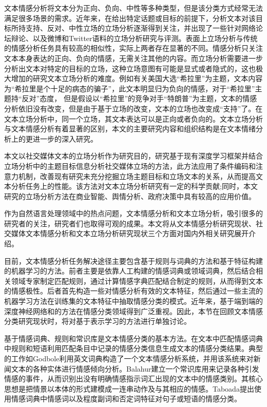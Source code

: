 文本情感分析将文本分为正向、负向、中性等多种类型，但是该分类方式经常无法满足很多场景的需求。近年来，在给出特定话题或目标的前提下，分析文本对该目标所持支持、反对、中性立场的立场分析逐渐得到关注，并出现了一些针对网络论坛辩论、以及微博和Twitter语料的立场分析研究与评测。表面上立场分析与传统的情感分析任务具有较高的相似性，实际上两者存在显著的不同。情感分析只关注文本本身表达的正向、负向的情感，无需关注其他的内容。而立场分析需要进一步分析出文本对特定的目标的立场，这种立场意图有可能是显式或者隐式的，这也极大增加的研究文本立场分析的难度。例如有关美国大选“希拉里”为主题，文本内容为“希拉里是个十足的病态的骗子”，此文本明显归为负向的情感，对于“希拉里”主题持“反对”态度， 但是假设以“希拉里”的竞争对手“特朗普”为主题，文本的情感分析依旧没有改变，但是由于基于立场的改变，文本的立场也改变成“支持”了。在文本立场分析中，同一个立场，其文本表达可以是正向或者负向的。文本立场分析与文本情感分析有着显著的区别，本文的主要研究内容和组织结构是在文本情绪分析上的更进一步的深入研究。

本文以社交媒体文本的立场分析作为研究目的，研究基于现有深度学习框架并结合立场分析中的主题目标信息分析社交媒体立场的方法，此方法应用了条件编码和注意力机制，改善现有研究未充分挖掘立场主题目标和立场文本的关系，从而提高文本分析任务上的性能。该方法对文本立场分析研究有一定的科学贡献;同时，本文研究的立场分析方法在商业智能、舆情分析、政府决策中具有较高的应用价值。



作为自然语言处理领域中的热点问题，文本情感分析和文本立场分析，吸引很多的研究者的关注，研究者们也取得可观的成果。本文将从文本情感分析研究现状、社交媒体文本情感分析和文本立场分析研究现状三个方面对国内外相关研究展开介绍。



目前，文本情感分析任务解决途径主要包含基于规则与词典的方法和基于特征构建的机器学习的方法。前者主要是依靠人工构建的情感词典或领域词典，然后结合相关领域专家制定匹配规则，通过计算情感字典匹配结合制定的规则，从而得到文本的情感极性。后者首先构造一些对情感分析有效的文本特征，然后通过一些主流的机器学习方法在训练集的文本特征中抽取情感分类的模式。近年来，基于端到端的深度神经网络和的方法在情感分类领域得到广泛重视。因此，本节在回顾文本情感分类研究现状时，将对基于表示学习的方法进行单独讨论。

基于情感词典、规则和常识库是文本情感分类的基本方法。在文本中匹配情感词典中规则和短语利用匹配条目中记录的情感分类信息生成文本的情感分类结果。典型的工作如Godbole利用英文词典构造了一个文本情感分析系统，并用该系统来对新闻文本的各种实体进行情感倾向分析。Balahur建立一个常识库用来记录各种引发情感的事件，从而识别出没有明确情感指示词汇出现的文本中的情感类别。其核心思想是把情景以本体的形式建模成一连串动作及与其相应的情感。Taboada提出使用情感词典中情感词以及程度副词和否定词特征对句子或短语的情感分类。

